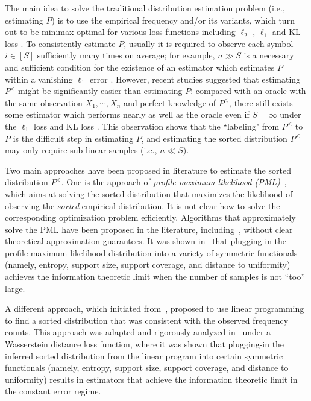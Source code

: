 \documentclass[final,12pt]{colt2018} %
\begin{document}
The main idea to solve the traditional distribution estimation problem (i.e., estimating $P$) is to use the empirical frequency and/or its variants, which turn out to be minimax optimal for various loss functions including $\ell_2$ \cite{Steinhaus1957problem,Trybula1958problem,Rutkowska1977minimax,Olkin1979admissible}, $\ell_1$ \cite{daskalakis2012learning,Diakonikolas2014beyond,han2015minimax,kamath2015learning} and KL loss \cite{kamath2015learning}. To consistently estimate $P$, usually it is required to observe each symbol $i\in [S]$ sufficiently many times on average; for example, $n\gg S$ is a necessary and sufficient condition for the existence of an estimator which estimates $P$ within a vanishing $\ell_1$ error \cite{han2015minimax}. However, recent studies suggested that estimating $P^<$ might be significantly easier than estimating $P$: compared with an oracle with the same observation $X_1,\cdots,X_n$ and perfect knowledge of $P^<$, there still exists some estimator which performs nearly as well as the oracle even if $S=\infty$ under the $\ell_1$ loss \cite{valiant2015instance} and KL loss \cite{orlitsky2015competitive}. This observation shows that the ``labeling" from $P^<$ to $P$ is the difficult step in estimating $P$, and estimating the sorted distribution $P^<$ may only require sub-linear samples (i.e., $n\ll S$).

Two main approaches have been proposed in literature to estimate the sorted distribution $P^{<}$. One is the approach of \emph{profile maximum likelihood (PML)}~\cite{orlitsky2004modeling,acharya2009recent}, which aims at solving the sorted distribution that maximizes the likelihood of observing the \emph{sorted} empirical distribution. It is not clear how to solve the corresponding optimization problem efficiently. Algorithms that approximately solve the PML have been proposed in the literature, including~\cite{orlitsky2004modeling,vontobel2012bethe,pavlichin2017approximate}, without clear theoretical approximation guarantees. It was shown in~\cite{acharya2016unified} that plugging-in the profile maximum likelihood distribution into a variety of symmetric functionals (namely, entropy, support size, support coverage, and distance to uniformity) achieves the information theoretic limit when the number of samples is not ``too'' large. 

A different approach, which initiated from~\cite{Efron--Thisted1976}, proposed to use linear programming to find a sorted distribution that was consistent with the observed frequency
counts. This approach was adapted and rigorously analyzed in~\cite{Valiant--Valiant2011,Valiant--Valiant2013estimating} under a Wasserstein distance loss function, where it was shown that plugging-in the inferred sorted distribution from the linear program into certain symmetric functionals (namely, entropy, support size, support coverage, and distance to uniformity) results in estimators that achieve the information theoretic limit in the constant error regime. 
\end{document}
